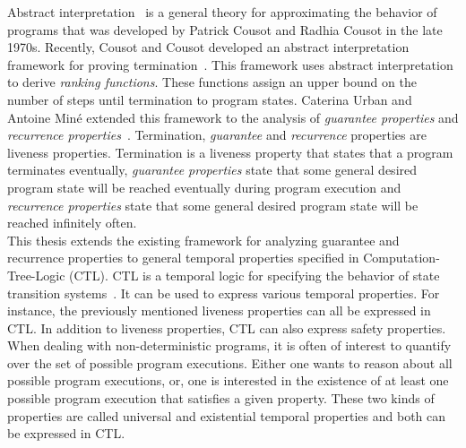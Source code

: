\documentclass[11pt,a4paper,titlepage]{article}
\theoremstyle{definition}
\begin{document}
Abstract interpretation~\cite{Cousot:1977:AIU:512950.512973} is a general theory for approximating the behavior of programs that was 
developed by Patrick Cousot and Radhia Cousot in the late 1970s. 
Recently, Cousot and Cousot developed an abstract interpretation framework for proving termination~\cite{CousotCousot-POPL12}. 
This framework uses abstract interpretation to derive \emph{ranking functions}. These functions assign an upper bound on the number of steps until termination
to program states. Caterina Urban and Antoine Miné extended this framework to the analysis of 
\emph{guarantee properties} and \emph{recurrence properties}~\cite{UrbanM-VMCAI15}.
Termination, \emph{guarantee} and \emph{recurrence} properties are liveness properties. 
Termination is a liveness property that states that a program terminates eventually, 
\emph{guarantee properties} state that some general desired program state will be reached eventually during program execution and 
\emph{recurrence properties} state that some general desired program state will be reached infinitely often.\\

This thesis extends the existing framework for analyzing guarantee and recurrence properties to 
general temporal properties specified in Computation-Tree-Logic (CTL).
CTL is a temporal logic for specifying the behavior of state transition systems~\cite{baier2008principles}. 
It can be used to express various temporal properties. For instance, the previously mentioned liveness properties can all be expressed in CTL. 
In addition to liveness properties, CTL can also express safety properties.\\

When dealing with non-deterministic programs, it is often of interest to quantify over the set of possible program executions. 
Either one wants to reason about all possible program executions, or, one is interested in the existence 
of at least one possible program execution that satisfies a given property. 
These two kinds of properties are called universal and existential temporal properties and both can be expressed in CTL.\\
\end{document}
